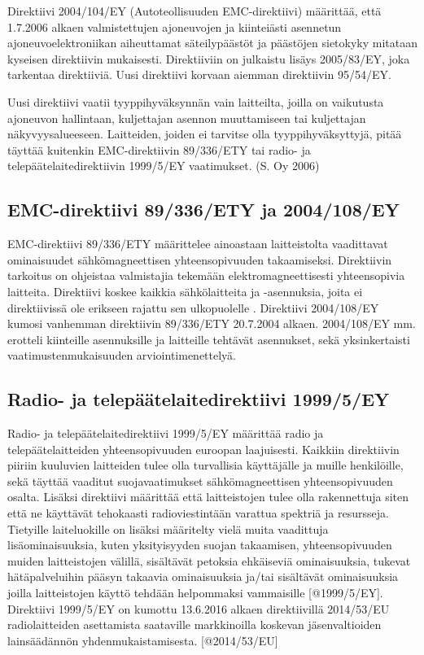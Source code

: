 \documentclass[11pt,a4paper,oneside,article]{memoir}
\begin{document}
Direktiivi 2004/104/EY (Autoteollisuuden EMC-direktiivi) määrittää, että
1.7.2006 alkaen valmistettujen ajoneuvojen ja kiinteiästi asennetun
ajoneuvoelektroniikan aiheuttamat säteilypäästöt ja päästöjen sietokyky
mitataan kyseisen direktiivin mukaisesti. Direktiiviin on julkaistu
lisäys 2005/83/EY, joka tarkentaa direktiiviä. Uusi direktiivi korvaan
aiemman direktiivin 95/54/EY.

Uusi direktiivi vaatii tyyppihyväksynnän vain laitteilta, joilla on
vaikutusta ajoneuvon hallintaan, kuljettajan asennon muuttamiseen tai
kuljettajan näkyvyysalueeseen. Laitteiden, joiden ei tarvitse olla
tyyppihyväksyttyjä, pitää täyttää kuitenkin EMC-direktiivin 89/336/ETY
tai radio- ja telepäätelaitedirektiivin 1999/5/EY vaatimukset. (S. Oy
2006) \cite{1999/5/EY} \cite{89/336/ETY}

\subsection{EMC-direktiivi 89/336/ETY ja
2004/108/EY}

EMC-direktiivi 89/336/ETY määrittelee ainoastaan laitteistolta
vaadittavat ominaisuudet sähkömagneettisen yhteensopivuuden
takaamiseksi. Direktiivin tarkoitus on ohjeistaa valmistajia tekemään
elektromagneettisesti yhteensopivia laitteita. Direktiivi koskee kaikkia
sähkölaitteita ja -asennuksia, joita ei direktiivissä ole erikseen
rajattu sen ulkopuolelle \cite{89/336/ETY}. Direktiivi 2004/108/EY
kumosi vanhemman direktiivin 89/336/ETY 20.7.2004 alkaen. 2004/108/EY
mm. erotteli kiinteille asennuksille ja laitteille tehtävät asennukset,
sekä yksinkertaisti vaatimustenmukaisuuden arviointimenettelyä.
\cite{2004/108/EY}

\subsection{Radio- ja telepäätelaitedirektiivi
1999/5/EY}

Radio- ja telepäätelaitedirektiivi 1999/5/EY määrittää radio ja
telepäätelaitteiden yhteensopivuuden euroopan laajuisesti. Kaikkiin
direktiivin piiriin kuuluvien laitteiden tulee olla turvallisia
käyttäjälle ja muille henkilöille, sekä täyttää vaaditut
suojavaatimukset sähkömagneettisen yhteensopivuuden osalta. Lisäksi
direktiivi määrittää että laitteistojen tulee olla rakennettuja siten
että ne käyttävät tehokaasti radioviestintään varattua spektriä ja
resursseja. Tietyille laiteluokille on lisäksi määritelty vielä muita
vaadittuja lisäominaisuuksia, kuten yksityisyyden suojan takaamisen,
yhteensopivuuden muiden laitteistojen välillä, sisältävät petoksia
ehkäiseviä ominaisuuksia, tukevat hätäpalveluihin pääsyn takaavia
ominaisuuksia ja/tai sisältävät ominaisuuksia joilla laitteistojen
käyttö tehdään helpommaksi vammaisille {[}@1999/5/EY{]}. Direktiivi
1999/5/EY on kumottu 13.6.2016 alkaen direktiivillä 2014/53/EU
radiolaitteiden asettamista saataville markkinoilla koskevan
jäsenvaltioiden lainsäädännön yhdenmukaistamisesta. {[}@2014/53/EU{]}
\end{document}
